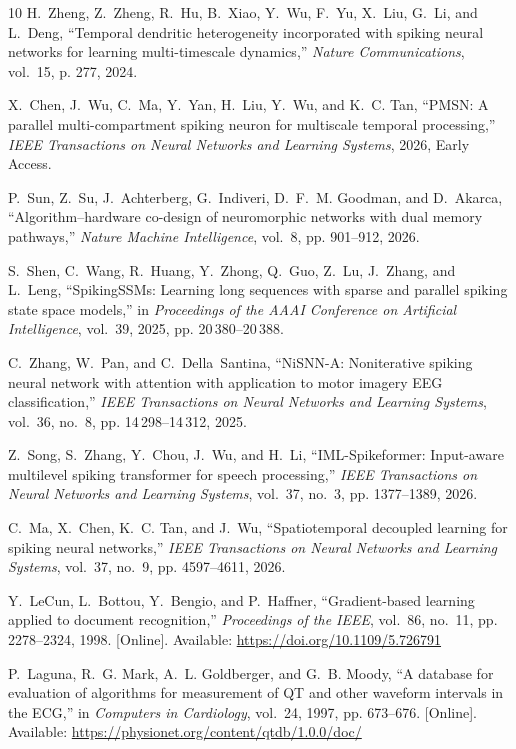 \documentclass[letterpaper,journal]{IEEEtran}
\begin{document}
\begin{thebibliography}{10}
H.~Zheng, Z.~Zheng, R.~Hu, B.~Xiao, Y.~Wu, F.~Yu, X.~Liu, G.~Li, and L.~Deng,
  ``Temporal dendritic heterogeneity incorporated with spiking neural networks
  for learning multi-timescale dynamics,'' \emph{Nature Communications},
  vol.~15, p. 277, 2024.

X.~Chen, J.~Wu, C.~Ma, Y.~Yan, H.~Liu, Y.~Wu, and K.~C. Tan, ``{PMSN}: A
  parallel multi-compartment spiking neuron for multiscale temporal
  processing,'' \emph{IEEE Transactions on Neural Networks and Learning
  Systems}, 2026, Early Access.

P.~Sun, Z.~Su, J.~Achterberg, G.~Indiveri, D.~F.~M. Goodman, and D.~Akarca,
  ``Algorithm--hardware co-design of neuromorphic networks with dual memory
  pathways,'' \emph{Nature Machine Intelligence}, vol.~8, pp. 901--912, 2026.

S.~Shen, C.~Wang, R.~Huang, Y.~Zhong, Q.~Guo, Z.~Lu, J.~Zhang, and L.~Leng,
  ``{SpikingSSMs}: Learning long sequences with sparse and parallel spiking
  state space models,'' in \emph{Proceedings of the AAAI Conference on
  Artificial Intelligence}, vol.~39, 2025, pp. 20\,380--20\,388.

C.~Zhang, W.~Pan, and C.~Della~Santina, ``{NiSNN-A}: Noniterative spiking
  neural network with attention with application to motor imagery {EEG}
  classification,'' \emph{IEEE Transactions on Neural Networks and Learning
  Systems}, vol.~36, no.~8, pp. 14\,298--14\,312, 2025.

Z.~Song, S.~Zhang, Y.~Chou, J.~Wu, and H.~Li, ``{IML-Spikeformer}: Input-aware
  multilevel spiking transformer for speech processing,'' \emph{IEEE
  Transactions on Neural Networks and Learning Systems}, vol.~37, no.~3, pp.
  1377--1389, 2026.

C.~Ma, X.~Chen, K.~C. Tan, and J.~Wu, ``Spatiotemporal decoupled learning for
  spiking neural networks,'' \emph{IEEE Transactions on Neural Networks and
  Learning Systems}, vol.~37, no.~9, pp. 4597--4611, 2026.

\BIBentryALTinterwordspacing
Y.~LeCun, L.~Bottou, Y.~Bengio, and P.~Haffner, ``Gradient-based learning
  applied to document recognition,'' \emph{Proceedings of the IEEE}, vol.~86,
  no.~11, pp. 2278--2324, 1998. [Online]. Available:
  \url{https://doi.org/10.1109/5.726791}
\BIBentrySTDinterwordspacing

\BIBentryALTinterwordspacing
P.~Laguna, R.~G. Mark, A.~L. Goldberger, and G.~B. Moody, ``A database for
  evaluation of algorithms for measurement of {QT} and other waveform intervals
  in the {ECG},'' in \emph{Computers in Cardiology}, vol.~24, 1997, pp.
  673--676. [Online]. Available:
  \url{https://physionet.org/content/qtdb/1.0.0/doc/}
\BIBentrySTDinterwordspacing


\end{thebibliography}
\end{document}
